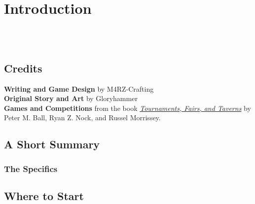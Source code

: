 \chapter{Introduction}

{\entryfont \ \\\\}

\section{Credits}
\textbf{Writing and Game Design} by M4RZ-Crafting\\
\textbf{Original Story and Art} by Gloryhammer\\
\textbf{Games and Competitions} from the book \href{https://marderz.store/rpgbooks/Dungeons%20and%20dragons%20mega%20book%20pack/EN%20publishing/Tournaments%2C%20Fairs%2C%20And%20Taverns.pdf}{\textit{Tournaments, Fairs, and Taverns}} by Peter M. Ball, Ryan Z. Nock, and Russel Morrissey.

\section{A Short Summary}
{\entryfont \noindent }

\subsection{The Specifics}
{\entryfont \noindent }

\section{Where to Start}
{\entryfont \noindent }
